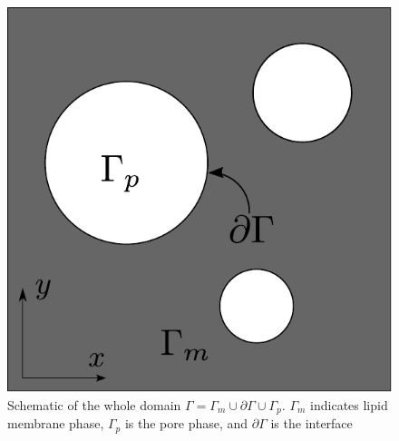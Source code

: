 \documentclass[english,12pt]{article}
\begin{document}
\begin{figure}[H]
	\centering
	\includegraphics[scale=0.55]{pics/model1_2.pdf}
	\caption{\footnotesize{Schematic of the whole domain $\Gamma = \Gamma_m \cup \partial\Gamma \cup \Gamma_p$. $\Gamma_m$ indicates lipid membrane phase, $\Gamma_p$ is the pore phase, and $\partial\Gamma$ is the interface }}
	\label{fig:model1}
\end{figure}
\end{document}
